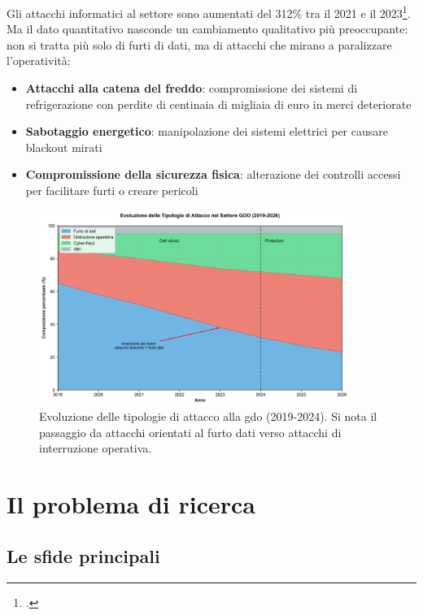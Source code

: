 Gli attacchi informatici al settore sono aumentati del 312\% tra il 2021 e il 2023\footcite{enisa2024retail}. Ma il dato quantitativo nasconde un cambiamento qualitativo più preoccupante: non si tratta più solo di furti di dati, ma di attacchi che mirano a paralizzare l'operatività:

\begin{itemize}
\item \textbf{Attacchi alla catena del freddo}: compromissione dei sistemi di refrigerazione con perdite di centinaia di migliaia di euro in merci deteriorate
\item \textbf{Sabotaggio energetico}: manipolazione dei sistemi elettrici per causare blackout mirati
\item \textbf{Compromissione della sicurezza fisica}: alterazione dei controlli accessi per facilitare furti o creare pericoli
\end{itemize}

\begin{figure}[htbp]
\centering
\includegraphics[width=0.9\textwidth]{thesis_figures/cap1/fig_evoluzione_attacchi.png}
\caption{Evoluzione delle tipologie di attacco alla \gls{gdo} (2019-2024). Si nota il passaggio da attacchi orientati al furto dati verso attacchi di interruzione operativa.}
\label{fig:attack_evolution}
\end{figure}

\section{Il problema di ricerca}
\label{sec:problema_ricerca}

\subsection{Le sfide principali}
\label{subsec:sfide_principali}

